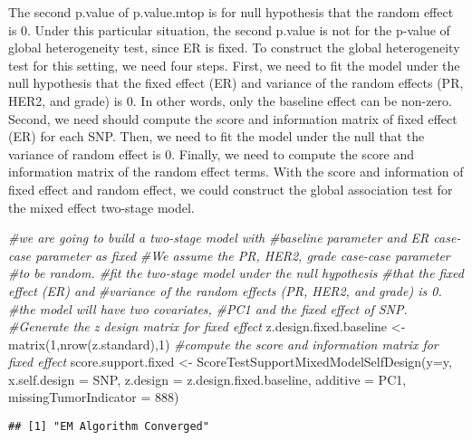\documentclass[11pt,]{article}
\newenvironment{Shaded}{\begin{snugshade}}{\end{snugshade}}
\newcommand{\AttributeTok}[1]{\textcolor[rgb]{0.77,0.63,0.00}{#1}}
\newcommand{\CommentTok}[1]{\textcolor[rgb]{0.56,0.35,0.01}{\textit{#1}}}
\newcommand{\DecValTok}[1]{\textcolor[rgb]{0.00,0.00,0.81}{#1}}
\newcommand{\FunctionTok}[1]{\textcolor[rgb]{0.00,0.00,0.00}{#1}}
\newcommand{\NormalTok}[1]{#1}
\newcommand{\OtherTok}[1]{\textcolor[rgb]{0.56,0.35,0.01}{#1}}
\begin{document}
The second p.value of p.value.mtop is for null hypothesis that the
random effect is 0. Under this particular situation, the second p.value
is not for the p-value of global heterogeneity test, since ER is fixed.
To construct the global heterogeneity test for this setting, we need
four steps. First, we need to fit the model under the null hypothesis
that the fixed effect (ER) and variance of the random effects (PR, HER2,
and grade) is 0. In other words, only the baseline effect can be
non-zero. Second, we need should compute the score and information
matrix of fixed effect (ER) for each SNP. Then, we need to fit the model
under the null that the variance of random effect is 0. Finally, we need
to compute the score and information matrix of the random effect terms.
With the score and information of fixed effect and random effect, we
could construct the global association test for the mixed effect
two-stage model.

\begin{Shaded}
\begin{Highlighting}[]
\CommentTok{\#we are going to build a two{-}stage model with }
\CommentTok{\#baseline parameter and ER case{-}case parameter as fixed}
\CommentTok{\#We assume the PR, HER2, grade case{-}case parameter }
\CommentTok{\#to be random.}
\CommentTok{\#fit the two{-}stage model under the null hypothesis}
\CommentTok{\#that the fixed effect (ER) and }
\CommentTok{\#variance of the random effects (PR, HER2, and grade) is 0.}
\CommentTok{\#the model will have two covariates, }
\CommentTok{\#PC1 and the fixed effect of SNP.}
\CommentTok{\#Generate the z design matrix for fixed effect}
\NormalTok{z.design.fixed.baseline }\OtherTok{\textless{}{-}} \FunctionTok{matrix}\NormalTok{(}\DecValTok{1}\NormalTok{,}\FunctionTok{nrow}\NormalTok{(z.standard),}\DecValTok{1}\NormalTok{)}
\CommentTok{\#compute the score and information matrix for fixed effect}
\NormalTok{score.support.fixed }\OtherTok{\textless{}{-}} \FunctionTok{ScoreTestSupportMixedModelSelfDesign}\NormalTok{(}\AttributeTok{y=}\NormalTok{y,}
                        \AttributeTok{x.self.design  =}\NormalTok{ SNP,}
                        \AttributeTok{z.design =}\NormalTok{ z.design.fixed.baseline,}
                        \AttributeTok{additive =}\NormalTok{ PC1,}
                        \AttributeTok{missingTumorIndicator =} \DecValTok{888}\NormalTok{)}
\end{Highlighting}
\end{Shaded}

\begin{verbatim}
## [1] "EM Algorithm Converged"
\end{verbatim}
\end{document}
